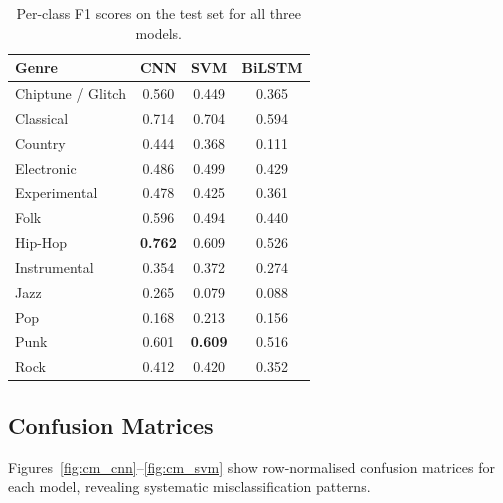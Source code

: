 \documentclass[12pt, a4paper]{article}
\begin{document}
\begin{table}[h!]
    \centering
    \caption{Per-class F1 scores on the test set for all three models.}
    \label{tab:perclass_f1}
    \begin{tabular}{lccc}
        \toprule
        \textbf{Genre} & \textbf{CNN} & \textbf{SVM} & \textbf{BiLSTM} \\
        \midrule
        Chiptune / Glitch  & 0.560 & 0.449 & 0.365 \\
        Classical          & 0.714 & 0.704 & 0.594 \\
        Country            & 0.444 & 0.368 & 0.111 \\
        Electronic         & 0.486 & 0.499 & 0.429 \\
        Experimental       & 0.478 & 0.425 & 0.361 \\
        Folk               & 0.596 & 0.494 & 0.440 \\
        Hip-Hop            & \textbf{0.762} & 0.609 & 0.526 \\
        Instrumental       & 0.354 & 0.372 & 0.274 \\
        Jazz               & 0.265 & 0.079 & 0.088 \\
        Pop                & 0.168 & 0.213 & 0.156 \\
        Punk               & 0.601 & \textbf{0.609} & 0.516 \\
        Rock               & 0.412 & 0.420 & 0.352 \\
        \bottomrule
    \end{tabular}
\end{table}

\subsection{Confusion Matrices}

Figures~\ref{fig:cm_cnn}--\ref{fig:cm_svm} show row-normalised confusion matrices for
each model, revealing systematic misclassification patterns.
\end{document}

